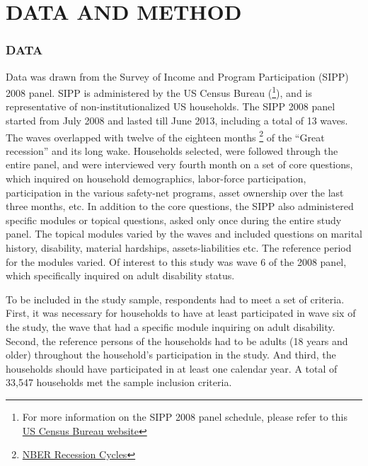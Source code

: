 \documentclass[11pt]{extarticle} %
\begin{document}

\section*{DATA AND METHOD}
\subsubsection*{DATA}
Data was drawn from the Survey of Income and Program Participation (SIPP) 2008 panel. SIPP is administered by the US Census Bureau ({\footnote{For more information on the SIPP 2008 panel schedule, please refer to this \href{http://www.census.gov/programs-surveys/sipp/data/2008-panel.html}{US Census Bureau website}}}), and is representative of non-institutionalized US households. The SIPP 2008 panel started from July 2008 and lasted till June 2013, including a total of 13 waves. The waves overlapped with twelve of the eighteen months {\footnote{\href{http://www.nber.org/cycles/}{NBER Recession Cycles}}} of the “Great recession” and its long wake. Households selected, were followed through the entire panel, and were interviewed very fourth month on a set of core questions, which inquired on household demographics, labor-force participation, participation in the various safety-net programs, asset ownership over the last three months, etc. In addition to the core questions, the SIPP also administered specific modules or topical questions, asked only once during the entire study panel. The topical modules varied by the waves and included questions on marital history, disability, material hardships, assets-liabilities etc. The reference period for the modules varied. Of interest to this study was wave 6 of the 2008 panel, which specifically inquired on adult disability status.

To be included in the study sample, respondents had to meet a set of criteria. First, it was necessary for households to have at least participated in wave six of the study, the wave that had a specific module inquiring on adult disability. Second, the reference persons of the households had to be adults (18 years and older) throughout the household's participation in the study. And third, the households should have participated in at least one calendar year. A total of 33,547 households met the sample inclusion criteria. 
\end{document}
